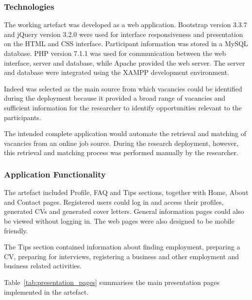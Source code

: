 \subsubsection{Technologies}

The working artefact was developed as a web application. Bootstrap version 3.3.7 and jQuery version 3.2.0 were used for interface responsiveness and presentation on the HTML and CSS interface. Participant information was stored in a MySQL database. PHP version 7.1.1 was used for communication between the web interface, server and database, while Apache provided the web server. The server and database were integrated using the XAMPP development environment.

Indeed was selected as the main source from which vacancies could be identified during the deployment because it provided a broad range of vacancies and sufficient information for the researcher to identify opportunities relevant to the participants.

The intended complete application would automate the retrieval and matching of vacancies from an online job source. During the research deployment, however, this retrieval and matching process was performed manually by the researcher.


\subsubsection{Application Functionality}

The artefact included Profile, FAQ and Tips sections, together with Home, About and Contact pages. Registered users could log in and access their profiles, generated CVs and generated cover letters. General information pages could also be viewed without logging in. The web pages were also designed to be mobile friendly.

The Tips section contained information about finding employment, preparing a CV, preparing for interviews, registering a business and other employment and business related activities.

Table~\ref{tab:presentation_pages} summarises the main presentation pages implemented in the artefact.

